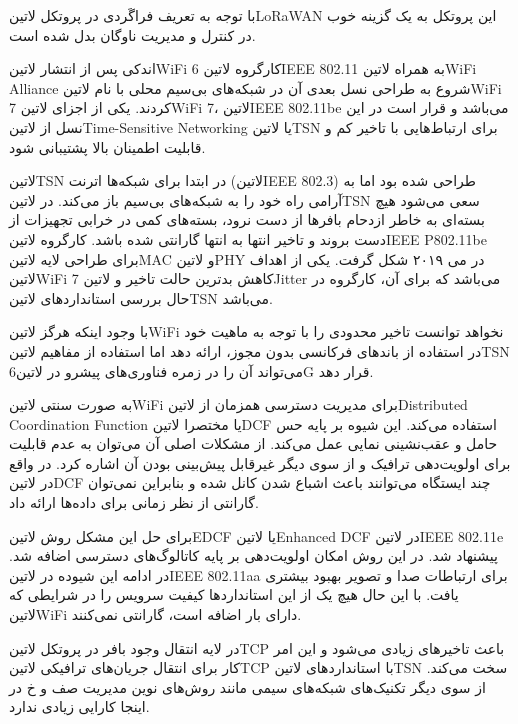 با توجه به تعریف فراگَردی در پروتکل ‌لاتین{LoRaWAN} این پروتکل به یک گزینه خوب در کنترل و مدیریت ناوگان بدل شده است.


اندکی پس از انتشار ‌لاتین{WiFi 6} کارگروه ‌لاتین{IEEE 802.11} به همراه ‌لاتین{WiFi Alliance} شروع به طراحی نسل بعدی آن در شبکه‌های بی‌سیم محلی با نام ‌لاتین{WiFi 7} کردند.
یکی از اجزای ‌لاتین{WiFi 7}، ‌لاتین{IEEE 802.11be} می‌باشد و قرار است در این نسل از ‌لاتین{Time-Sensitive Networking} یا ‌لاتین{TSN} برای ارتباط‌هایی با تاخیر کم و قابلیت
اطمینان بالا پشتیبانی شود.

‌لاتین{TSN} در ابتدا برای شبکه‌ها اترنت (‌لاتین{IEEE 802.3}) طراحی شده بود اما به آرامی راه خود را به شبکه‌های بی‌سیم باز می‌کند. در ‌لاتین{TSN} سعی می‌شود
هیچ بسته‌ای به خاطر ازدحام بافرها از دست نرود، بسته‌های کمی در خرابی تجهیزات از دست بروند و تاخیر انتها به انتها گارانتی شده باشد.
کارگروه ‌لاتین{IEEE P802.11be} برای طراحی لایه ‌لاتین{MAC} و ‌لاتین{PHY} در می ۲۰۱۹ شکل گرفت. یکی از اهداف ‌لاتین{WiFi 7} کاهش بدترین حالت تاخیر و ‌لاتین{Jitter} می‌باشد
که برای آن، کارگروه در حال بررسی استانداردهای ‌لاتین{TSN} می‌باشد.

با وجود اینکه هرگز ‌لاتین{WiFi} نخواهد توانست تاخیر محدودی را با توجه به ماهیت خود در استفاده از باندهای فرکانسی بدون مجوز، ارائه دهد اما استفاده از مفاهیم ‌لاتین{TSN}
می‌تواند آن را در زمره فناوری‌های پیشرو در ‌لاتین{6G} قرار دهد.

به صورت سنتی ‌لاتین{WiFi} برای مدیریت دسترسی همزمان از ‌لاتین{Distributed Coordination Function} یا مختصرا ‌لاتین{DCF} استفاده می‌کند.
این شیوه بر پایه حس حامل و عقب‌نشینی نمایی عمل می‌کند. از مشکلات اصلی آن می‌توان به عدم قابلیت برای اولویت‌دهی ترافیک و از سوی دیگر غیرقابل پیش‌بینی بودن
آن اشاره کرد. در واقع در ‌لاتین{DCF} چند ایستگاه می‌توانند باعث اشباع شدن کانل شده و بنابراین نمی‌توان گارانتی از نظر زمانی برای داده‌ها ارائه داد.

برای حل این مشکل روش ‌لاتین{EDCF} یا ‌لاتین{Enhanced DCF} در ‌لاتین{IEEE 802.11e} پیشنهاد شد. در این روش امکان اولویت‌دهی بر پایه
کاتالوگ‌های دسترسی اضافه شد. در ادامه این شیوده در ‌لاتین{IEEE 802.11aa} برای ارتباطات صدا و تصویر بهبود بیشتری یافت.
با این حال هیچ یک از این استانداردها کیفیت سرویس را در شرایطی که ‌لاتین{WiFi} دارای بار اضافه است، گارانتی نمی‌کنند.

در لایه انتقال وجود بافر در پروتکل ‌لاتین{TCP} باعث تاخیرهای زیادی می‌شود و این امر کار برای انتقال جریان‌های ترافیکی ‌لاتین{TCP}
با استانداردهای ‌لاتین{TSN} سخت می‌کند. از سوی دیگر تکنیک‌های شبکه‌های سیمی مانند روش‌های نوین مدیریت صف و ‌خ در اینجا
کارایی زیادی ندارد.

